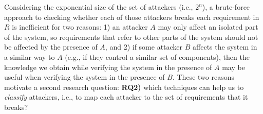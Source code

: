 Considering the exponential size of the set of attackers (i.e., $2^{n}$), a brute-force approach to checking whether each of those attackers breaks each requirement in $R$ is inefficient for two reasons: 1) an attacker $A$ may only affect an isolated part of the system, so requirements that refer to other parts of the system should not be affected by the presence of $A$, and 2) if some attacker $B$ affects the system in a similar way to $A$ (e.g., if they control a similar set of components), then the knowledge we obtain while verifying the system in the presence of $A$ may be useful when verifying the system in the presence of $B$. These two reasons motivate a second research question: \textbf{RQ2)} which techniques can help us to \emph{classify} attackers, i.e., to map each attacker to the set of requirements that it breaks? 

